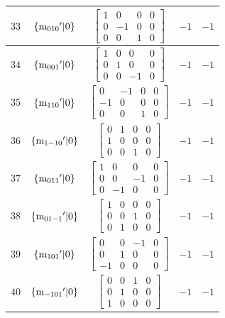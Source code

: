 \documentclass[fleqn,8pt]{jsarticle}
\begin{document}
\begin{longtable}{ccccc}
$ 33 $ & $ \{{\rm m}_{010}{}'|0\} $ & $ \begin{bmatrix} 1 & 0 & 0 & 0 \\ 0 & -1 & 0 & 0 \\ 0 & 0 & 1 & 0 \end{bmatrix} $ & $ -1 $ & $ -1 $ \\ \hline
$ 34 $ & $ \{{\rm m}_{001}{}'|0\} $ & $ \begin{bmatrix} 1 & 0 & 0 & 0 \\ 0 & 1 & 0 & 0 \\ 0 & 0 & -1 & 0 \end{bmatrix} $ & $ -1 $ & $ -1 $ \\ \hline
$ 35 $ & $ \{{\rm m}_{110}{}'|0\} $ & $ \begin{bmatrix} 0 & -1 & 0 & 0 \\ -1 & 0 & 0 & 0 \\ 0 & 0 & 1 & 0 \end{bmatrix} $ & $ -1 $ & $ -1 $ \\ \hline
$ 36 $ & $ \{{\rm m}_{1-10}{}'|0\} $ & $ \begin{bmatrix} 0 & 1 & 0 & 0 \\ 1 & 0 & 0 & 0 \\ 0 & 0 & 1 & 0 \end{bmatrix} $ & $ -1 $ & $ -1 $ \\ \hline
$ 37 $ & $ \{{\rm m}_{011}{}'|0\} $ & $ \begin{bmatrix} 1 & 0 & 0 & 0 \\ 0 & 0 & -1 & 0 \\ 0 & -1 & 0 & 0 \end{bmatrix} $ & $ -1 $ & $ -1 $ \\ \hline
$ 38 $ & $ \{{\rm m}_{01-1}{}'|0\} $ & $ \begin{bmatrix} 1 & 0 & 0 & 0 \\ 0 & 0 & 1 & 0 \\ 0 & 1 & 0 & 0 \end{bmatrix} $ & $ -1 $ & $ -1 $ \\ \hline
$ 39 $ & $ \{{\rm m}_{101}{}'|0\} $ & $ \begin{bmatrix} 0 & 0 & -1 & 0 \\ 0 & 1 & 0 & 0 \\ -1 & 0 & 0 & 0 \end{bmatrix} $ & $ -1 $ & $ -1 $ \\ \hline
$ 40 $ & $ \{{\rm m}_{-101}{}'|0\} $ & $ \begin{bmatrix} 0 & 0 & 1 & 0 \\ 0 & 1 & 0 & 0 \\ 1 & 0 & 0 & 0 \end{bmatrix} $ & $ -1 $ & $ -1 $ \\ \hline

\end{longtable}
\end{document}
